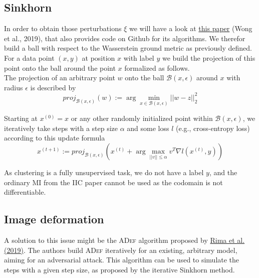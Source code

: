 \documentclass[]{article}
\begin{document}
\subsection{Sinkhorn}
In order to obtain those perturbations $\xi$ we will have a look at \href{http://proceedings.mlr.press/v97/wong19a/wong19a.pdf}{this paper} (Wong et al., 2019), that also provides code on Github for its algorithms. We therefor build a ball with respect to the Wasserstein ground metric as previously defined. For a data point $(x,y)$ at position $x$ with label $y$ we build the projection of this point onto the ball around the point $x$ formalized as follows.\\

The projection of an arbitrary point $w$ onto the ball $\mathcal{B}(x,\epsilon)$ around $x$ with radius $\epsilon$ is described by
\begin{equation}
	proj_{\mathcal{B}(x,\epsilon)}(w):=\arg \min_{x\in\mathcal{B}(x,\epsilon)}||w-z||^2_2
\end{equation}

Starting at $x^{(0)}=x$ or any other randomly initialized point within $\mathcal{B}(x,\epsilon)$, we iteratively take steps with a step size $\alpha$ and some loss $l$ (e.g., cross-entropy loss) according to this update formula
\begin{equation}
	x^{(t+1)} := proj_{\mathcal{B}(x,\epsilon)} (x^{(t)} + \arg \max_{||v||\leq\alpha}v^T\nabla l(x^{(t)},y))
\end{equation}

As clustering is a fully unsupervised task, we do not have a label $y$, and the ordinary MI from the IIC paper cannot be used as the codomain is not differentiable.

\subsection{Image deformation}
A solution to this issue might be the \textsc{ADef} algorithm proposed by \href{https://openreview.net/pdf?id=Hk4dFjR5K7}{Rima et al. (2019)}. The authors build \textsc{ADef} iteratively for an existing, arbitrary model, aiming for an adversarial attack. This algorithm can be used to simulate the steps with a given step size, as proposed by the iterative Sinkhorn method.  
\end{document}
